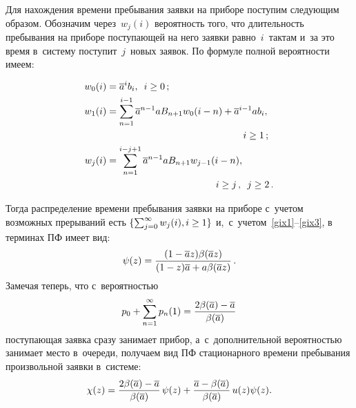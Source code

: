 \begin{multicols}{2}
\vspace*{-2pt}

Для нахождения времени пребывания заявки на приборе поступим следующим образом.
Обозначим через~$w_j(i)$ вероятность того, что длительность пребывания
на приборе поступающей на него заявки равно~$i$~тактам и~за это время
в~систему поступит~$j$~новых заявок. По формуле полной ве\-ро\-ят\-ности имеем:

\vspace*{-3pt}

\noindent
\begin{align}
\label{gix1}
w_0(i)&= \overline{a}^i b_i, \enskip i \ge 0\,;
\\
w_1(i)&=\sum\limits_{n=1}^{i-1} \overline{a}^{n-1}a B_{n+1} 
w_0(i-n)+\overline{a}^{i-1}a b_i, \notag\\
&\hspace*{50mm}i \ge 1\,; 
\label{gix2}
\\
w_j(i)&=\sum\limits_{n=1}^{i-j+1} \overline{a}^{n-1}a B_{n+1} w_{j-1}(i-n), \notag \\
& \hspace*{40mm}i \ge j\,, \enskip j \ge 2\,. \label{gix3}
\end{align}

\vspace*{-2pt}

\noindent
Тогда
распределение времени пребывания заявки на приборе с~учетом возможных прерываний
есть $\{\sum\nolimits_{j=0}^\infty w_j(i), i \hm\ge 1\}$ 
и,~с~учетом~\eqref{gix1}--\eqref{gix3},
в терминах ПФ имеет вид:
\begin{equation}
\label{ppsi}
\psi(z)=
\displaystyle\frac{\displaystyle ( 1- \overline{a} z) \beta(\overline{a} z) \mathstrut}{\displaystyle (1-z)\overline{a} + a \beta(\overline{a} z)\mathstrut}\,.
\end{equation}
Замечая теперь, что с~вероятностью
$$
p_0+\sum\limits_{n=1}^\infty p_n(1)=
\fr{2\beta(\overline{a})
\hm-\overline{a}}{\beta(\overline{a})}
$$
поступающая заявка сразу занимает прибор,
а~с~дополнительной вероятностью занимает место в~очереди,
получаем вид ПФ стационарного времени пребывания произвольной заявки
в~системе:
\begin{equation}
\label{vpgf}
\chi(z)=\displaystyle\frac{\displaystyle  2\beta(\overline{a})-\overline{a}\mathstrut}{\displaystyle \beta(\overline{a})\mathstrut}\, \psi(z) +
\displaystyle\frac{\displaystyle  \overline{a} - \beta(\overline{a}) \mathstrut}{\displaystyle \beta(\overline{a})\mathstrut} \,u(z) \psi(z).
\end{equation}

\vspace*{-6pt}

\pagebreak


\end{multicols}
